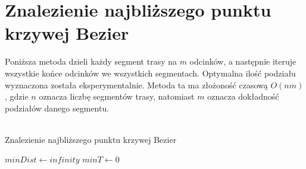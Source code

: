 \section{Znalezienie najbliższego punktu krzywej Bezier}
Poniższa metoda dzieli każdy segment trasy na $m$ odcinków, a następnie iteruje wszystkie końce odcinków we wszystkich segmentach. Optymalna ilość podziału wyznaczona została eksperymentalnie. Metoda ta ma złożoność czasową $O(nm)$, gdzie $n$ oznacza liczbę segmentów trasy, natomiast $m$ oznacza dokładność podziałów danego segmentu.
\\\\
\begin{algorithm}[H]
    \caption{Znalezienie najbliższego punktu krzywej Bezier}\label{alg}
    $minDist \gets infinity$\;
    $minT \gets 0$\;
\end{algorithm}
\phantom{.}\\

